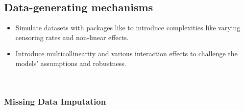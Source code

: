 \subsection{Data-generating mechanisms}
\begin{itemize}
\item Simulate datasets with packages like \parencite{davidson-pilon_lifelines_2024} to introduce complexities like varying censoring rates and non-linear effects.
\item Introduce multicollinearity and various interaction effects to challenge the models' assumptions and robustness.
\end{itemize}
\
\subsubsection*{Missing Data Imputation}

